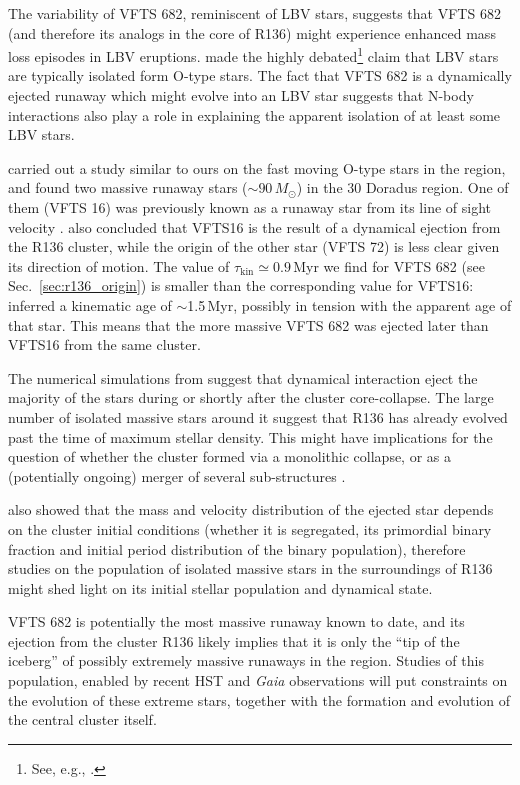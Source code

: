 \documentclass[apjl,twocolumn]{emulateapj}
\DeclareRobustCommand{\Secref}[1]{Sec.~\ref{#1}}
\begin{document}
The variability of VFTS 682, reminiscent of LBV stars, suggests
that VFTS 682 (and therefore its analogs in the core of R136) might
experience enhanced mass loss episodes in LBV eruptions. \citet{smith:15} made the highly
debated\footnote{See, e.g., \cite{humphreys:16, davidson:16, smith:16}.}
claim that LBV stars are typically isolated form O-type stars. The fact that VFTS 682 is a dynamically
ejected runaway which might evolve into an LBV star suggests that
N-body interactions also play a role in explaining the apparent
isolation of at least some LBV stars. 

\citet{lennon:18} carried out a study similar to ours on the fast
moving O-type stars
in the region, and found two massive runaway stars
($\sim$$90\,M_\odot$) in the 30 Doradus region. One of them (VFTS 16)
was previously known as a runaway star from its line of sight velocity
\citep[][]{evans:10}. \citet{lennon:18} also concluded that VFTS16 is 
the result of a dynamical ejection from the R136 cluster, while the
origin of the other star (VFTS 72) is less clear given its direction
of motion. The value of $\tau_\mathrm{kin}\simeq0.9$\,Myr we find for
VFTS 682 (see \Secref{sec:r136_origin}) is smaller than the
corresponding value for VFTS16: \cite{lennon:18} inferred a kinematic
age of $\sim$1.5\,Myr, possibly in tension with the apparent age of that star. This means that the more
massive VFTS 682 was ejected later than VFTS16 from the same cluster.

The numerical simulations from \cite{oh:16} suggest that dynamical
interaction eject the majority of the stars during or shortly after the cluster
core-collapse. The large number of isolated massive stars around it
suggest that R136 has already evolved past the
time of maximum stellar density. This might have implications for the
question of whether the cluster formed via a monolithic collapse, or
as a (potentially ongoing) merger of several sub-structures \citep[e.g.,]{sabbi:12}.

\citet{oh:16} also showed that the mass and velocity distribution of the ejected star depends on the cluster initial conditions
(whether it is segregated, its primordial binary fraction and initial period
distribution of the binary population), therefore studies on
the population of isolated massive stars in the surroundings of R136
might shed light on its initial stellar population and dynamical
state. 

VFTS 682 is potentially the most massive runaway known to date, and its ejection
from the cluster R136 likely implies that it is only the ``tip of the
iceberg'' of possibly extremely massive runaways in the
region. Studies of this population, enabled by recent HST and \emph{Gaia} observations will put constraints on the evolution
of these extreme stars, together with the formation and evolution of
the central cluster itself.
\end{document}
